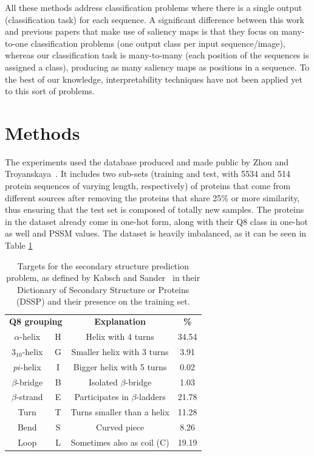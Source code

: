 \documentclass{article}
\begin{document}
All these methods address classification problems where there is a single output (classification task) for each sequence. A significant difference between this work and previous papers that make use of saliency maps is that they focus on many-to-one classification problems (one output class per input sequence/image), whereas our classification task is many-to-many (each position of the sequences is assigned a class), producing as many saliency maps as positions in a sequence. To the best of our knowledge, interpretability techniques have not been applied yet to this sort of problems.

\section{Methods}
\label{sec:methods}

The experiments used the database produced and made public by Zhou and Troyanskaya~\cite{Zhou2014}. It includes two sub-sets (training and test, with 5534 and 514 protein sequences of varying length, respectively) of proteins that come from different sources after removing the proteins that share 25\% or more similarity, thus ensuring that the test set is composed of totally new samples. The proteins in the dataset already come in one-hot form, along with their Q8 class in one-hot as well and PSSM values. The dataset is heavily imbalanced, as it can be seen in Table \ref{table:q8}

\begin{table}
	\begin{tabular}{cc|c|c}
		\multicolumn{2}{c}{\textbf{Q8 grouping}} &  \textbf{Explanation} & \textbf{\%}\\ 
		$\alpha$-helix & H & Helix with 4 turns & 34.54 \\ 
		$3_{10}$-helix & G & Smaller helix with 3 turns & 3.91 \\ 
		$pi$-helix      & I & Bigger helix with 5 turns & 0.02 \\ \hline
		$\beta$-bridge & B & Isolated $\beta$-bridge & 1.03 \\ 
		$\beta$-strand & E & Participates in $\beta$-ladders & 21.78\\ \hline
		Turn & T & Turns smaller than a helix & 11.28 \\ 
		Bend & S & Curved piece & 8.26 \\ 
		Loop & L & Sometimes also as coil (C) & 19.19
	\end{tabular}
	\caption{Targets for the secondary structure prediction problem, as defined by Kabsch and Sander~\cite{Kabsch1983} in their Dictionary of Secondary Structure or Proteins (DSSP) and their presence on the training set.}
	\label{table:q8}
\end{table}
\end{document}
